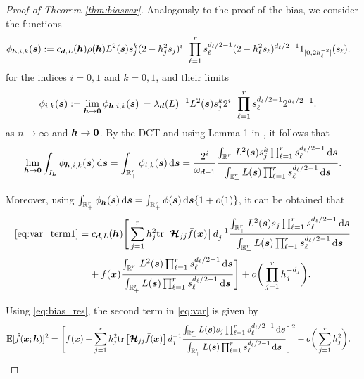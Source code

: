 \documentclass[oneside,11pt]{article}
\begin{document}
\begin{proof}[Proof of Theorem \ref{thm:biasvar}]
Analogously to the proof of the bias, we consider the functions
\begin{align*}
    \phi_{{\boldsymbol{h}},i,k}(\boldsymbol{s}):=&\; c_{\boldsymbol{d},L}({\boldsymbol{h}}) \rho({\boldsymbol{h}}) L^2(\boldsymbol{s}) s_j^k  (2-h_j^2s_j)^i\,\;\prod_{\ell=1}^r s_\ell^{d_\ell/2-1} (2-h_\ell^2s_\ell)^{d_\ell/2-1} 1_{[0,2h^{-2}_\ell]}(s_\ell).
\end{align*}
for the indices $i=0,1$ and $k=0,1$, and their limits
\begin{align*}
    \phi_{{i,k}}(\boldsymbol{s}):=\lim_{{\boldsymbol{h}}\to \mathbf{0}}\phi_{{{\boldsymbol{h}},i,k}}(\boldsymbol{s})\,&=\lambda_{\boldsymbol{d}}(L)^{-1}L^2(\boldsymbol{s})s_j^k 2^i\,\;\prod_{\ell=1}^r s_\ell^{d_\ell/2-1} 2^{d_\ell/2-1}.
\end{align*}
as $n\to\infty$ and ${\boldsymbol{h}}\to \mathbf{0}$. By the %
DCT and using Lemma 1 in \cite{Garcia-Portugues2013b}, it follows that
\begin{align*}
    \lim_{\bh\to \zero}\int_{I_\bh}\phi_{{\bh,i,k}}(\bs)\,\rd \bs=\int_{\R_+^r}\phi_{i,k}(\bs)\,\rd \bs%
    =
    \frac{2^{i}}{\omega_{\bd-1}}\frac{\int_{\R_+^r}L^2(\bs)s_j^k\prod_{\ell=1}^r s_\ell^{d_\ell/2-1}\,\rd \bs}{\int_{\R_+^r}L(\bs)\prod_{\ell=1}^rs_\ell^{d_\ell/2-1}\,\rd \bs}.
\end{align*}

Moreover, using $\int_{\mathbb{R}_+^r}\phi_{{{\boldsymbol{h}}}}(\boldsymbol{s})\,\mathrm{d} \boldsymbol{s}=\int_{\mathbb{R}_+^r}\phi{{}}(\boldsymbol{s})\,\mathrm{d} \boldsymbol{s}\{1+o(1)\}$, it can be obtained that
\begin{align}\label{var_calc2}
	\eqref{eq:var_term1}=
	&\; c_{\boldsymbol{d},L}({\boldsymbol{h}})\Bigg[\sum_{j=1}^rh_j^2\mathrm{tr}\left[\boldsymbol{\mathcal{H}}_{jj}\bar{f}(\boldsymbol{x})\right]d_j^{-1}\frac{\int_{\mathbb{R}_+^r}L^2(\boldsymbol{s})s_j\prod_{\ell=1}^r s_\ell^{d_\ell/2-1}\,\mathrm{d} \boldsymbol{s}}{\int_{\mathbb{R}_+^r}L(\boldsymbol{s})\prod_{\ell=1}^rs_\ell^{d_\ell/2-1}\,\mathrm{d} \boldsymbol{s}}\nonumber\\
        &+f(\boldsymbol{x})\frac{\int_{\mathbb{R}_+^r}L^2(\boldsymbol{s})\prod_{\ell=1}^r s_\ell^{d_\ell/2-1}\,\mathrm{d} \boldsymbol{s}}{\int_{\mathbb{R}_+^r}L(\boldsymbol{s})\prod_{\ell=1}^rs_\ell^{d_\ell/2-1}\,\mathrm{d} \boldsymbol{s}}\Bigg]+o\bigg(\prod_{j=1}^r h_j^{-d_j}\bigg).
\end{align}

Using \eqref{eq:bias_res}, the second term in \eqref{eq:var} is given by
\begin{align}
    \mathbb{E}[\hat{f}(\boldsymbol{x};{\boldsymbol{h}})]^2&
    =\Bigg[f(\boldsymbol{x})+\sum_{j=1}^rh_j^2\mathrm{tr}\left[\boldsymbol{\mathcal{H}}_{jj}\bar{f}(\boldsymbol{x})\right]d_j^{-1}\frac{\int_{\mathbb{R}_+^r}L(\boldsymbol{s})s_j\prod_{\ell=1}^r s_\ell^{d_\ell/2-1}\,\mathrm{d} \boldsymbol{s}}{\int_{\mathbb{R}_+^r}L(\boldsymbol{s})\prod_{\ell=1}^rs_\ell^{d_\ell/2-1}\,\mathrm{d} \boldsymbol{s}}\Bigg]^2+o\bigg(\sum_{j=1}^rh_j^2\bigg).\label{eq:biassq}
\end{align}


\end{proof}
\end{document}

